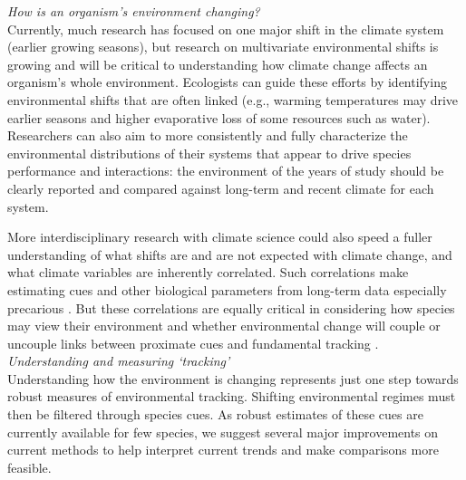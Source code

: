 \documentclass[11pt,letterpaper]{article}
\newcommand{\R}[1]{\label{#1}\linelabel{#1}}
\begin{document}
\emph{How is an organism's environment changing?} \\ 
Currently, much research has focused on one major shift in the climate system (earlier growing seasons), but research on multivariate environmental shifts is growing and will be critical to understanding how climate change affects an organism's whole environment. Ecologists can guide these efforts by identifying environmental shifts that are often linked (e.g., warming temperatures may drive earlier seasons and higher evaporative loss of some resources such as water). Researchers can also aim to more consistently and fully characterize the environmental distributions of their systems that appear to drive species performance and interactions: the environment of the years of study should be clearly reported and compared against long-term and recent climate for each system. 

More interdisciplinary research with climate science could also speed a fuller understanding of what shifts are and are not expected with climate change, and what climate variables are inherently correlated. Such correlations make estimating cues and other biological parameters from long-term data especially precarious \citep{tansey2017}. But these correlations are equally critical in considering how species may view their environment and whether environmental change will couple or uncouple links between proximate cues and fundamental tracking \citep{bonamour2019}. \\

\emph{Understanding and measuring `tracking'} \\
\R{understandquotestart}Understanding how the environment is changing represents just one step towards robust measures of environmental tracking. Shifting environmental regimes must then be filtered through species cues. As robust estimates of these cues are currently available for few species, we suggest several major improvements on current methods to help interpret current trends and make comparisons more feasible. 
\end{document}
